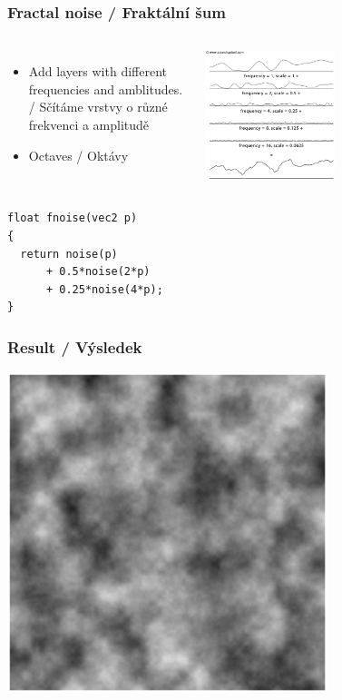 \begin{frame}[fragile]\frametitle{Fractal noise / Fraktální šum}
\begin{columns}[c]
  \begin{itemize}
    \item Add layers with different frequencies and amblitudes. / Sčítáme vrstvy o různé frekvenci a amplitudě
    \item Octaves / Oktávy
  \end{itemize}
    \includegraphics[width=0.5\textwidth]{pics/procedural/1dnoise-fractal.eps}
\end{columns}
\begin{verbatim}
float fnoise(vec2 p)
{
  return noise(p)
      + 0.5*noise(2*p)
      + 0.25*noise(4*p);
}
\end{verbatim}
\end{frame}

\begin{frame}\frametitle{Result / Výsledek}
  \includegraphics[width=0.7\textwidth]{pics/procedural/2dnoise-fractal.eps}
\end{frame}

